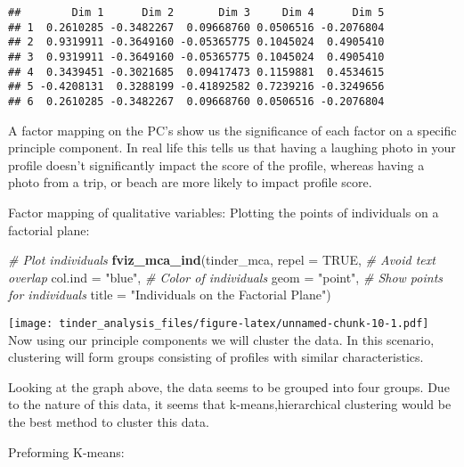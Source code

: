 \documentclass[
]{article}
\newenvironment{Shaded}{\begin{snugshade}}{\end{snugshade}}
\newcommand{\AttributeTok}[1]{\textcolor[rgb]{0.13,0.29,0.53}{#1}}
\newcommand{\CommentTok}[1]{\textcolor[rgb]{0.56,0.35,0.01}{\textit{#1}}}
\newcommand{\ConstantTok}[1]{\textcolor[rgb]{0.56,0.35,0.01}{#1}}
\newcommand{\FunctionTok}[1]{\textcolor[rgb]{0.13,0.29,0.53}{\textbf{#1}}}
\newcommand{\NormalTok}[1]{#1}
\newcommand{\StringTok}[1]{\textcolor[rgb]{0.31,0.60,0.02}{#1}}
\begin{document}
\begin{verbatim}
##        Dim 1      Dim 2       Dim 3     Dim 4      Dim 5
## 1  0.2610285 -0.3482267  0.09668760 0.0506516 -0.2076804
## 2  0.9319911 -0.3649160 -0.05365775 0.1045024  0.4905410
## 3  0.9319911 -0.3649160 -0.05365775 0.1045024  0.4905410
## 4  0.3439451 -0.3021685  0.09417473 0.1159881  0.4534615
## 5 -0.4208131  0.3288199 -0.41892582 0.7239216 -0.3249656
## 6  0.2610285 -0.3482267  0.09668760 0.0506516 -0.2076804
\end{verbatim}

A factor mapping on the PC's show us the significance of each factor on
a specific principle component. In real life this tells us that having a
laughing photo in your profile doesn't significantly impact the score of
the profile, whereas having a photo from a trip, or beach are more
likely to impact profile score.

Factor mapping of qualitative variables: Plotting the points of
individuals on a factorial plane:

\begin{Shaded}
\begin{Highlighting}[]
\CommentTok{\# Plot individuals}
\FunctionTok{fviz\_mca\_ind}\NormalTok{(tinder\_mca, }
             \AttributeTok{repel =} \ConstantTok{TRUE}\NormalTok{,        }\CommentTok{\# Avoid text overlap}
             \AttributeTok{col.ind =} \StringTok{"blue"}\NormalTok{,    }\CommentTok{\# Color of individuals}
             \AttributeTok{geom =} \StringTok{"point"}\NormalTok{,      }\CommentTok{\# Show points for individuals}
             \AttributeTok{title =} \StringTok{"Individuals on the Factorial Plane"}\NormalTok{)}
\end{Highlighting}
\end{Shaded}

\texttt{[image: tinder\_analysis\_files/figure-latex/unnamed-chunk-10-1.pdf]}
Now using our principle components we will cluster the data. In this
scenario, clustering will form groups consisting of profiles with
similar characteristics.

Looking at the graph above, the data seems to be grouped into four
groups. Due to the nature of this data, it seems that
k-means,hierarchical clustering would be the best method to cluster this
data.

Preforming K-means:
\end{document}
